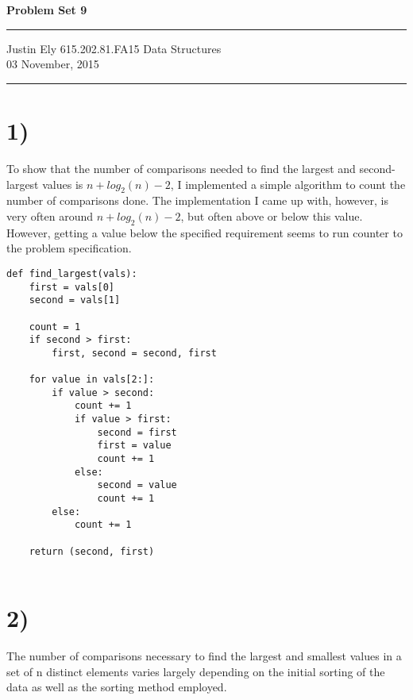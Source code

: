 \documentclass[a4paper,11pt]{article}
\begin{document}
\begin{flushright}

\vspace{1.1cm}

{\bf\Huge Problem Set 9}

\rule{0.25\linewidth}{0.5pt}

\vspace{0.5cm}
Justin Ely
\linebreak
\newline
\footnotesize{615.202.81.FA15 Data Structures \\}
\vspace{0.5cm}
03 November, 2015
\end{flushright}

\noindent\rule{\linewidth}{1.0pt}


\section*{1)}
To show that the number of comparisons needed to find the largest and second-largest values is $n + log_{2}(n) - 2$, I 
implemented a simple algorithm to count the number of comparisons done.  The implementation I came up with, however, 
is very often around $n + log_{2}(n) - 2$, but often above or below this value.  However, getting a value below the specified requirement
seems to run counter to the problem specification.

\begin{verbatim}
def find_largest(vals):
    first = vals[0]
    second = vals[1]
    
    count = 1
    if second > first:
        first, second = second, first
        
    for value in vals[2:]:
        if value > second:
            count += 1
            if value > first:
                second = first
                first = value
                count += 1
            else:
                second = value
                count += 1
        else:
            count += 1
                
    return (second, first)
    
\end{verbatim}


\section*{2)}
The number of comparisons necessary to find the largest and smallest values in a set of n distinct elements varies 
largely depending on the initial sorting of the data as well as the sorting method employed.  
\end{document}
